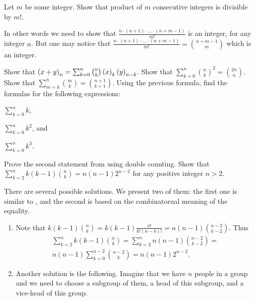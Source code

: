 \begin{chapterendexercises}
  \exercise Let $m$ be some integer. Show that product of $m$ consecutive
    integers is divisible by $m!$.
    \begin{solution}
     In other words we need to show that 
     $\frac{n \cdot (n + 1) \cdot \dots \cdot (n + m - 1)}{m!}$ is an integer,
     for any integer $n$. But one may notice that 
     $\frac{n \cdot (n + 1) \cdot \dots \cdot (n + m - 1)}{m!} = 
      \binom{n + m - 1}{m}$ which is an integer.
    \end{solution}
  \exercise Show that
    $\numberOfPermutations[n]{x + y} = \sum_{k = 0}^n \binom{n}{k}
      \numberOfPermutations[k]{x} \numberOfPermutations[n - k]{y}$.
  \exercise Show that
    $\sum_{k = 0}^n \binom{n}{k}^2 = \binom{2n}{n}$.
  \exercise Show that $\sum_{m = k}^n \binom{m}{k} =
    \binom{n + 1}{k + 1}$.
  \exercise Using the previous formula, find the formulas for the following
    expressions:
    \begin{enumerate*}
      \item $\sum_{k = 0}^n k$,
      \item $\sum_{k = 0}^n k^2$, and
      \item $\sum_{k = 0}^n k^3$.
    \end{enumerate*}
  \exercise Prove the second statement from 
	using double counting.
  \exercise Show that 
    $\sum_{k = 2}^n k (k - 1) \binom{n}{k} = n (n - 1) 2^{n - 2}$ for any
    positive integer $n > 2$.
    \begin{solution}
      There are several possible solutions. We present two of them: the first
      one is similar to , and the second is
      based on the combinatorual meaning of the equality.
      \begin{enumerate}
        \item Note that $k (k - 1) \binom{n}{k} = 
          k (k - 1) \frac{n!}{k! (n - k)!} = n (n - 1) \binom{n - 2}{k - 2}$.
          Thus
          \begin{multline*}
            \sum_{k = 2}^n k (k - 1) \binom{n}{k} =
            \sum_{k = 2}^n n (n - 1) \binom{n - 2}{k - 2} =  \\
              n (n - 1) \sum_{k = 0}^{n - 2} \binom{n - 2}{k} = 
              n (n - 1) 2^{n - 2}.
          \end{multline*}
        \item Another solution is the following. Imagine that we have $n$ people in a
          group and we need to choose a subgroup of them, a head of this subgroup, and
          a vice-head of this group.


\end{enumerate}
\end{solution}
\end{chapterendexercises}
